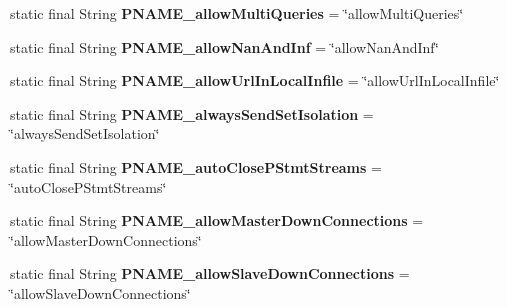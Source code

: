 \begin{DoxyCompactItemize}
static final String {\bfseries P\+N\+A\+M\+E\+\_\+allow\+Multi\+Queries} = \char`\"{}allow\+Multi\+Queries\char`\"{}
\item 
\mbox{\label{classcom_1_1mysql_1_1cj_1_1conf_1_1_property_definitions_ab75310233a5aab7d2401840e45237bc8}} 
static final String {\bfseries P\+N\+A\+M\+E\+\_\+allow\+Nan\+And\+Inf} = \char`\"{}allow\+Nan\+And\+Inf\char`\"{}
\item 
\mbox{\label{classcom_1_1mysql_1_1cj_1_1conf_1_1_property_definitions_a4a28905e92fafa3551fa7f0a0ab1509c}} 
static final String {\bfseries P\+N\+A\+M\+E\+\_\+allow\+Url\+In\+Local\+Infile} = \char`\"{}allow\+Url\+In\+Local\+Infile\char`\"{}
\item 
\mbox{\label{classcom_1_1mysql_1_1cj_1_1conf_1_1_property_definitions_a35228890151f69807856f0fc44c9b086}} 
static final String {\bfseries P\+N\+A\+M\+E\+\_\+always\+Send\+Set\+Isolation} = \char`\"{}always\+Send\+Set\+Isolation\char`\"{}
\item 
\mbox{\label{classcom_1_1mysql_1_1cj_1_1conf_1_1_property_definitions_a67a0d14b36ec0a0f97e351667805f637}} 
static final String {\bfseries P\+N\+A\+M\+E\+\_\+auto\+Close\+P\+Stmt\+Streams} = \char`\"{}auto\+Close\+P\+Stmt\+Streams\char`\"{}
\item 
\mbox{\label{classcom_1_1mysql_1_1cj_1_1conf_1_1_property_definitions_a86a40eee220920b0fc55ca260d0217ae}} 
static final String {\bfseries P\+N\+A\+M\+E\+\_\+allow\+Master\+Down\+Connections} = \char`\"{}allow\+Master\+Down\+Connections\char`\"{}
\item 
\mbox{\label{classcom_1_1mysql_1_1cj_1_1conf_1_1_property_definitions_a3b5dc1ba1d84b1757a6c8db990cfebe6}} 
static final String {\bfseries P\+N\+A\+M\+E\+\_\+allow\+Slave\+Down\+Connections} = \char`\"{}allow\+Slave\+Down\+Connections\char`\"{}
\item 
\mbox{\label{classcom_1_1mysql_1_1cj_1_1conf_1_1_property_definitions_ad17163a0213e8ea1efcd559046900157}} 

\end{DoxyCompactItemize}
